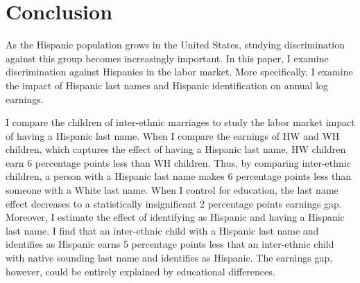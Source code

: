\documentclass[a4paper,fleqn]{cas-sc}
\begin{document}
\section{Conclusion}\label{sec:con1}

As the Hispanic population grows in the United States, studying discrimination against this group becomes increasingly important. In this paper, I examine discrimination against Hispanics in the labor market. More specifically, I examine the impact of Hispanic last names and Hispanic identification on annual log earnings.

I compare the children of inter-ethnic marriages to study the labor market impact of having a Hispanic last name. When I compare the earnings of HW and WH children, which captures the effect of having a Hispanic last name, HW children earn  6 percentage points less than WH children. Thus, by comparing inter-ethnic children, a person with a Hispanic last name makes 6 percentage points less than someone with a White last name. When I control for education, the last name effect decreases to a statistically insignificant 2 percentage points earnings gap. Moreover, I estimate the effect of identifying as Hispanic and having a Hispanic last name. I find that an inter-ethnic child with a Hispanic last name and identifies as Hispanic earns 5 percentage points less that an inter-ethnic child with native sounding last name and identifies as Hispanic. The earnings gap, however, could be entirely explained by educational differences.




\end{document}
